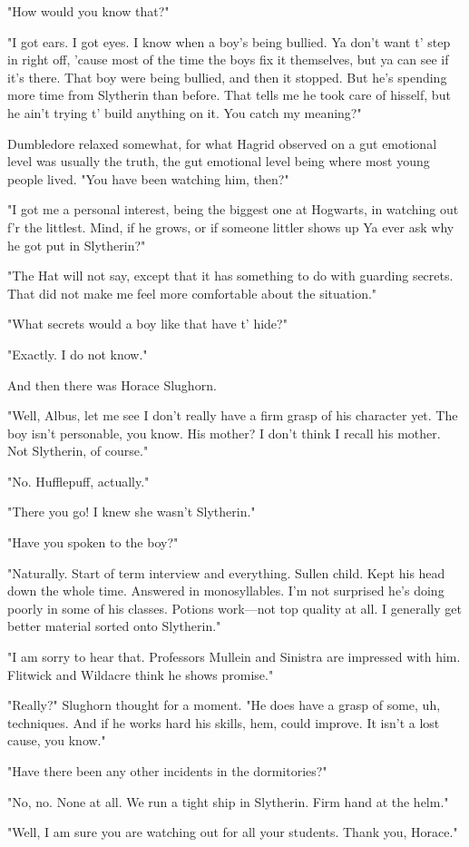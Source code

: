 "How would you know that?"

"I got ears. I got eyes. I know when a boy's being bullied. Ya don't want t' step in right off, 'cause most of the time the boys fix it themselves, but ya can see if it's there. That boy were being bullied, and then it stopped. But he's spending more time from Slytherin than before. That tells me he took care of hisself, but he ain't trying t' build anything on it. You catch my meaning?"

Dumbledore relaxed somewhat, for what Hagrid observed on a gut emotional level was usually the truth, the gut emotional level being where most young people lived. "You have been watching him, then?"

"I got me a personal interest, being the biggest one at Hogwarts, in watching out f'r the littlest. Mind, if he grows, or if someone littler shows up{\el} Ya ever ask why he got put in Slytherin?"

"The Hat will not say, except that it has something to do with guarding secrets. That did not make me feel more comfortable about the situation."

"What secrets would a boy like that have t' hide?"

"Exactly. I do not know."

And then there was Horace Slughorn.

"Well, Albus, let me see{\el} I don't really have a firm grasp of his character yet. The boy isn't personable, you know. His mother? I don't think I recall his mother. Not Slytherin, of course."

"No. Hufflepuff, actually."

"There you go! I knew she wasn't Slytherin."

"Have you spoken to the boy?"

"Naturally. Start of term interview and everything. Sullen child. Kept his head down the whole time. Answered in monosyllables. I'm not surprised he's doing poorly in some of his classes. Potions work—not top quality at all. I generally get better material sorted onto Slytherin."

"I am sorry to hear that. Professors Mullein and Sinistra are impressed with him. Flitwick and Wildacre think he shows promise."

"Really?" Slughorn thought for a moment. "He does have a grasp of some, uh, techniques. And if he works hard his skills, hem, could improve. It isn't a lost cause, you know."

"Have there been any other incidents in the dormitories?"

"No, no. None at all. We run a tight ship in Slytherin. Firm hand at the helm."

"Well, I am sure you are watching out for all your students. Thank you, Horace."


